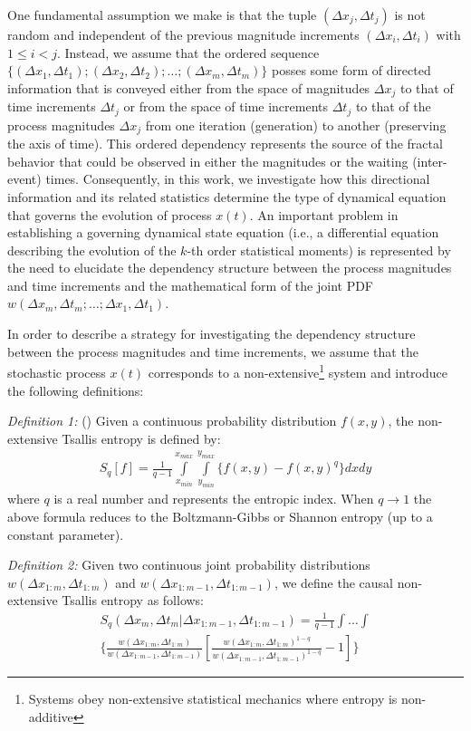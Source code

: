  One fundamental assumption we make is that the tuple $(\Delta x_{j}, \Delta t_{j})$ is not random and independent of the previous magnitude increments $(\Delta x_{i}, \Delta t_{i})$ with $ 1 \leq i < j$. Instead, we assume that the ordered sequence $ \{ (\Delta x_{1},\Delta t_{1}); (\Delta x_{2},\Delta t_{2}); \ldots ; (\Delta x_{m},\Delta t_{m}) \}$ posses some form of directed information that is conveyed either from the space of magnitudes $\Delta x_{j}$ to that of time increments $\Delta t_{j}$ or from the space of time increments  $\Delta t_{j}$ to that of the process magnitudes  $\Delta x_{j}$ from one iteration (generation) to another (preserving the axis of time). This ordered dependency represents the source of the fractal behavior that could be observed in either the magnitudes or the waiting (inter-event) times. Consequently, in this work, we investigate how this directional information and its related statistics determine the type of dynamical equation that governs the evolution of process $x(t)$. An important problem in establishing a governing dynamical state equation (i.e., a differential equation describing the evolution of the $k$-th order statistical moments) is represented by the need to elucidate the dependency structure between the process magnitudes and time increments and the mathematical form of the joint PDF $w(\Delta x_{m},\Delta t_{m};\ldots;\Delta x_{1},\Delta t_{1})$.  
 
 In order to describe a strategy for investigating the dependency structure between the process magnitudes and time increments, we assume that the stochastic process $x(t)$ corresponds to a non-extensive\footnote{Systems obey non-extensive statistical mechanics where entropy is non-additive} system and introduce the following definitions:

\textit{Definition 1:} (\cite{Tsallis1987}) Given a continuous probability distribution $f(x,y)$, the non-extensive Tsallis entropy is defined by:
\begin{eqnarray}
S_{q}[f] = \frac{1}{q-1}\int\limits_{x_{min}}^{x_{max}}\int\limits_{y_{min}}^{y_{max}}\{ f(x,y) - f(x,y)^{q}\}dxdy
\end{eqnarray} 
where $q$ is a real number and represents the entropic index. When $q \rightarrow 1$ the above formula reduces to the Boltzmann-Gibbs or Shannon entropy (up to a constant parameter).

\textit{Definition 2:} Given two continuous joint probability distributions $w(\Delta x_{1:m}, \Delta t_{1:m})$ and $w(\Delta x_{1:m-1}, \Delta t_{1:m-1})$, we define the causal non-extensive Tsallis entropy as follows:
\begin{eqnarray}
S_{q}(\Delta x_{m}, \Delta t_{m}|\Delta x_{1:m-1}, \Delta t_{1:m-1}) = \frac{1}{q-1} \int \ldots \int \nonumber\\
\{ \frac{w(\Delta x_{1:m},\Delta t_{1:m})}{w(\Delta x_{1:m-1},\Delta t_{1:m-1})}[\frac{w(\Delta x_{1:m},\Delta t_{1:m})^{1-q} }{w(\Delta x_{1:m-1},\Delta t_{1:m-1})^{1-q} }- 1] \} 
\end{eqnarray}


